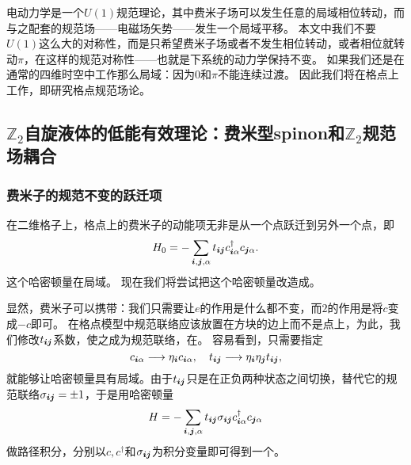 电动力学是一个$U(1)$规范理论，其中费米子场可以发生任意的局域相位转动，而与之配套的规范场——电磁场矢势——发生一个局域平移。
本文中我们不要$U(1)$这么大的对称性，而是只希望费米子场或者不发生相位转动，或者相位就转动$\pi$，在这样的规范对称性——也就是下系统的动力学保持不变。
如果我们还是在通常的四维时空中工作那么局域：因为$0$和$\pi$不能连续过渡。
因此我们将在格点上工作，即研究格点规范场论。

\subsection{$\mathbb{Z}_2$自旋液体的低能有效理论：费米型spinon和$\mathbb{Z}_2$规范场耦合}

\subsubsection{费米子的规范不变的跃迁项}

在二维格子上，格点上的费米子的动能项无非是从一个点跃迁到另外一个点，即
\begin{equation}
    {H}_0 = - \sum_{\vb*{i}, \vb*{j}, \alpha} t_{\vb*{i} \vb*{j}} {c}_{\vb*{i} \alpha}^\dagger {c}_{\vb*{j} \alpha}.
    \label{eq:hopping-hamiltonian}
\end{equation}
这个哈密顿量在局域。
现在我们将尝试把这个哈密顿量改造成。

显然，费米子可以携带：我们只需要让$e$的作用是什么都不变，而$2$的作用是将$c$变成$-c$即可。
在格点模型中规范联络应该放置在方块的边上而不是点上，为此，我们修改$t_{\vb*{i} \vb*{j}}$系数，使之成为规范联络，在。
容易看到，只需要指定
\[
    {c}_{\vb*{i} \alpha} \longrightarrow \eta_{\vb*{i}} {c}_{\vb*{i} \alpha}, \quad t_{\vb*{i} \vb*{j}} \longrightarrow \eta_{\vb*{i}} \eta_{\vb*{j}} t_{\vb*{i} \vb*{j}},
\]
就能够让哈密顿量具有局域。由于$t_{\vb*{i} \vb*{j}}$只是在正负两种状态之间切换，替代它的规范联络$\sigma_{\vb*{i} \vb*{j}} = \pm 1$，于是用哈密顿量
\[
    {H} = - \sum_{\vb*{i}, \vb*{j}, \alpha} t_{\vb*{i} \vb*{j}} \sigma_{\vb*{i} \vb*{j}} {c}_{\vb*{i} \alpha}^\dagger {c}_{\vb*{j} \alpha}
\]
做路径积分，分别以${c}, {c}^\dagger$和$\sigma_{\vb*{i} \vb*{j}}$为积分变量即可得到一个。

